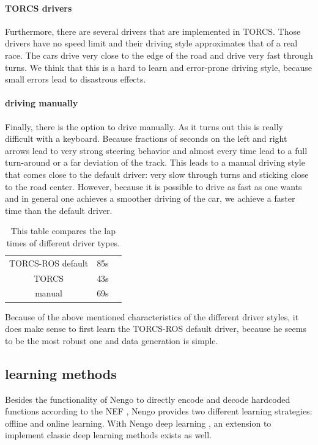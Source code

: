 \documentclass[10pt,a4paper,twoside,journal]{IEEEtran}
\begin{document}
\paragraph{TORCS drivers}
Furthermore, there are several drivers that are implemented in TORCS. Those drivers have no speed limit and their driving style approximates that of a real race. The cars drive very close to the edge of the road and drive very fast through turns. We think that this is a hard to learn and error-prone driving style, because small errors lead to disastrous effects.
\paragraph{driving manually}
Finally, there is the option to drive manually. As it turns out this is really difficult with a keyboard. Because fractions of seconds on the left and right arrows lead to very strong steering behavior and almost every time lead to a full turn-around or a far deviation of the track. This leads to a manual driving style that comes close to the default driver: very slow through turns and sticking close to the road center. However, because it is possible to drive as fast as one wants and in general one achieves a smoother driving of the car, we achieve a faster time than the default driver. \\
\begin{table}[ht]
	\begin{center}
		\begin{tabular}{ |c|c|c| } 
			\hline
			TORCS-ROS default & 85s \\
			TORCS  & 43s  \\
			manual & 69s \\
			\hline
		\end{tabular}
		\caption{\label{tab:torcs_laptime}This table compares the lap times of different driver types.}
	\end{center}
\end{table}
Because of the above mentioned characteristics of the different driver styles, it does make sense to first learn the TORCS-ROS default driver, because he seems to be the most robust one and data generation is simple.


\subsection{learning methods}

Besides the functionality of Nengo to directly encode and decode hardcoded functions according to the NEF \cite{nef}, Nengo provides two different learning strategies: offline and online learning. With Nengo deep learning \cite{nengo_dl}, an extension to implement classic deep learning methods exists as well.
\end{document}
